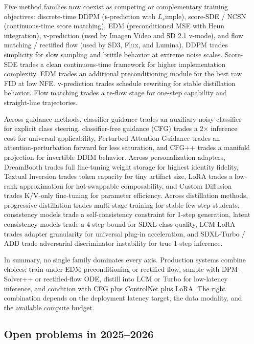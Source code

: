 Five method families now coexist as competing or complementary training objectives: discrete-time DDPM (ε-prediction with \(L_s\)imple), score-SDE / NCSN (continuous-time score matching), EDM (preconditioned MSE with Heun integration), v-prediction (used by Imagen Video and SD 2.1 v-mode), and flow matching / rectified flow (used by SD3, Flux, and Lumina). DDPM trades simplicity for slow sampling and brittle behavior at extreme noise scales. Score-SDE trades a clean continuous-time framework for higher implementation complexity. EDM trades an additional preconditioning module for the best raw FID at low NFE. v-prediction trades schedule rewriting for stable distillation behavior. Flow matching trades a re-flow stage for one-step capability and straight-line trajectories.

Across guidance methods, classifier guidance trades an auxiliary noisy classifier for explicit class steering, classifier-free guidance (CFG) trades a 2× inference cost for universal applicability, Perturbed-Attention Guidance trades an attention-perturbation forward for less saturation, and CFG++ trades a manifold projection for invertible DDIM behavior. Across personalization adapters, DreamBooth trades full fine-tuning weight storage for highest identity fidelity, Textual Inversion trades token capacity for tiny artifact size, LoRA trades a low-rank approximation for hot-swappable composability, and Custom Diffusion trades K/V-only fine-tuning for parameter efficiency. Across distillation methods, progressive distillation trades multi-stage training for stable few-step students, consistency models trade a self-consistency constraint for 1-step generation, latent consistency models trade a 4-step bound for SDXL-class quality, LCM-LoRA trades adapter granularity for universal plug-in acceleration, and SDXL-Turbo / ADD trade adversarial discriminator instability for true 1-step inference.

In summary, no single family dominates every axis. Production systems combine choices: train under EDM preconditioning or rectified flow, sample with DPM-Solver++ or rectified-flow ODE, distill into LCM or Turbo for low-latency inference, and condition with CFG plus ControlNet plus LoRA. The right combination depends on the deployment latency target, the data modality, and the available compute budget.

\subsection{Open problems in 2025--2026}\label{open-problems-in-20252026}

